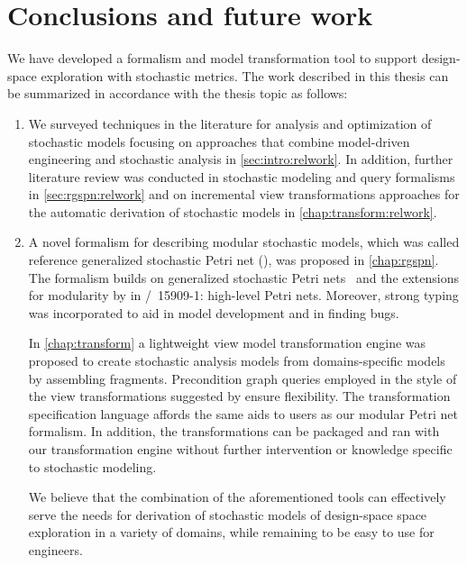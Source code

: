 \chapter{Conclusions and future work}
\label{chap:conclusion}

We have developed a formalism and model transformation tool to support design-space exploration with stochastic metrics. The work described in this thesis can be summarized in accordance with the thesis topic as follows:

\begin{enumerate}
\item We surveyed techniques in the literature for analysis and optimization of stochastic models focusing on approaches that combine model-driven engineering and stochastic analysis in \vref{sec:intro:relwork}. In addition, further literature review was conducted in stochastic modeling and query formalisms in \vref{sec:rgspn:relwork} and on incremental view transformations approaches for the automatic derivation of stochastic models in \vref{chap:transform:relwork}.
\item A novel formalism for describing modular stochastic models, which was called reference generalized stochastic Petri net (), was proposed in \vref{chap:rgspn}. The formalism builds on generalized stochastic Petri nets~\citep{Marsan84gspn} and the extensions for modularity by \citet{Kindler09modular} in /~15909-1:\citeyear{ISO1590912004} high-level Petri nets. Moreover, strong typing was incorporated to aid in model development and in finding bugs.

  In \vref{chap:transform} a lightweight view model transformation engine was proposed to create stochastic analysis models from domains-specific models by assembling  fragments. Precondition graph queries employed in the style of the view transformations suggested by \citet{Debreceni14viewmodel} ensure flexibility. The transformation specification language affords the same aids to users as our modular Petri net formalism. In addition, the transformations can be packaged and ran with our transformation engine without further intervention or knowledge specific to stochastic modeling.

  We believe that the combination of the aforementioned tools can effectively serve the needs for derivation of stochastic models of design-space space exploration in a variety of domains, while remaining to be easy to use for engineers.


\end{enumerate}
